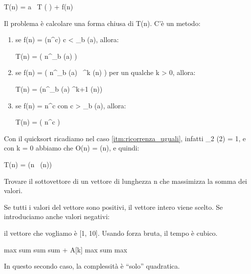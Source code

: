 T(n) = a \, T \left(  \right) + f(n)

Il problema \`e calcolare una forma chiusa di T(n). C'\`e un metodo:
\begin{enumerate}
    \item se f(n) = \Theta (n^c) c < \log_b (a), allora:

    T(n) = \Theta \left( n^{\log_b (a)} \right)

    \item\label{itm:ricorrenza_uguali} se f(n) = \Theta \left( n^{\log_b (a)} \, \log^k (n) \right) per un qualche k > 0, allora:

    T(n) = \Theta (n^{\log_b (a)} \cdot \log^{k+1} (n))

    \item se f(n) = n^c con c > \log_b (a), allora:

    T(n) = \Theta \left( n^c \right)
\end{enumerate}

Con il quicksort ricadiamo nel caso \ref{itm:ricorrenza_uguali}, infatti \log_2 (2) = 1, e con k = 0 abbiamo che O(n) = \Theta (n), e quindi:

T(n) = \Theta (n \, \log (n))

\begin{esercizio}
Trovare il sottovettore di un vettore di lunghezza n che massimizza la somma dei valori.
\end{esercizio}

Se tutti i valori del vettore sono positivi, il vettore intero viene scelto. Se introduciamo anche valori negativi:

\left[ 2, -3, 1, 10, -5, 2 \right]

il vettore che vogliamo \`e [1, 10]. Usando forza bruta, il tempo \`e cubico.

\begin{algorithm}
\begin{algorithmic}
    \State max 
            \State sum 
                \State sum \gets sum + A[k]
            \EndFor
                \State max \gets sum
            \EndIf
        \EndFor
    \EndFor
    \State \Return max
\EndFunction
\end{algorithmic}
\end{algorithm}

In questo secondo caso, la complessit\`a \`e ``solo'' quadratica.

